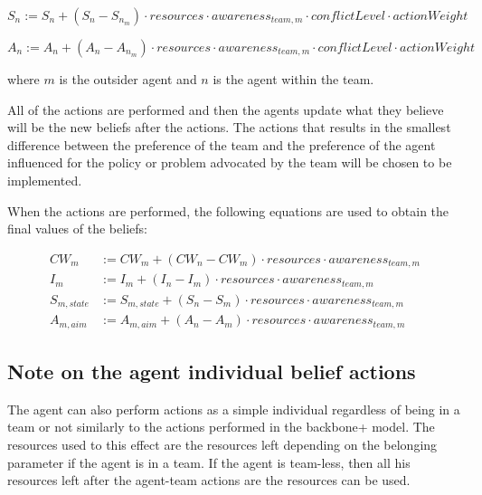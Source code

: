 \begin{itemize}
\begin{equation}
S_n :=  S_n +  \left(S_{n} - S_{n_m} \right) \cdot resources \cdot awareness_{team,m}  \cdot conflictLevel  \cdot actionWeight
\end{equation}


\begin{equation}
A_n :=  A_n + \left(A_{n} - A_{n_m} \right) \cdot resources \cdot awareness_{team,m}  \cdot conflictLevel  \cdot actionWeight
\end{equation}


where $m$ is the outsider agent and $n$ is the agent within the team.


All of the actions are performed and then the agents update what they believe will be the new beliefs after the actions. The actions that results in the smallest difference between the preference of the team and the preference of the agent influenced for the policy or problem advocated by the team will be chosen to be implemented.


When the actions are performed, the following equations are used to obtain the final values of the beliefs:


\begin{equation} \begin{split}
CW_m &:=  CW_m + \left(CW_{n} - CW_{m} \right) \cdot resources \cdot awareness_{team,m} \\
I_m &:=  I_m + \left(I_{n} - I_{m} \right) \cdot resources \cdot awareness_{team,m} \\
S_{m,state} &:=  S_{m,state} + \left(S_{n} - S_{m} \right) \cdot resources \cdot awareness_{team,m} \\
A_{m,aim} &:= A_{m,aim} + \left(A_{n} - A_{m} \right) \cdot resources \cdot awareness_{team,m} 
\end{split}\end{equation}


\end{itemize}


\subsection{Note on the agent individual belief actions}


The agent can also perform actions as a simple individual regardless of being in a team or not similarly to the actions performed in the backbone+ model. The resources used to this effect are the resources left depending on the belonging parameter if the agent is in a team. If the agent is team-less, then all his resources left after the agent-team actions are the resources can be used.


